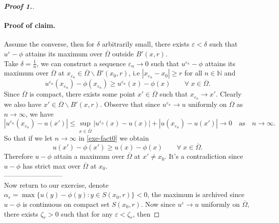 \documentclass[12pt, oneside]{amsart}  	%
\begin{document}
\begin{proof}[\textbf{Proof 1.}]
\paragraph{\textbf{Proof of claim.}} Assume the converse, then for $\delta$ arbitrarily small, there exists $\varepsilon<\delta$ such that $u^{\varepsilon} -\phi$ attains its maximum over $\overline{\Omega}$ outside $B'(x,r)$. \\
Take $\delta = \frac{1}{n}$, we can construct a sequence $\varepsilon_n \longrightarrow 0$ such that $u^{\varepsilon_n} - \phi$ attains its maximum over $\overline{\Omega}$ at $x_{\varepsilon_n} \in \overline{\Omega}\backslash B'(x_0,r)$, i.e $|x_{\varepsilon_n} - x_0| \geq r$ for all $n\in \mathbb{N}$ and
\begin{equation}\label{exe-fact0}
u^{\varepsilon_n}\left(x_{\varepsilon_n}\right) - \phi\left(x_{\varepsilon_n}\right) \geq  u^{\varepsilon_n}\left(x\right) - \phi\left(x\right) \qquad\forall\; x\in \overline{\Omega}.
\end{equation}
Since $\overline{\Omega}$ is compact, there exists some point $x'\in \overline{\Omega}$ such that $x_{\varepsilon_n} \longrightarrow x'$. Clearly we also have $x'\in \overline{\Omega}\backslash B'(x,r)$. Observe that since $u^{\varepsilon_n}\longrightarrow u$ uniformly on $\overline{\Omega}$ as $n\longrightarrow\infty$, we have
\begin{equation*}
\left|u^{\varepsilon_n}\left(x_{\varepsilon_n}\right) - u(x') \right|\leq \sup_{x\in \overline{\Omega}} \left|u^{\varepsilon_n}(x) - u(x)\right| + \left|u\left(x_{\varepsilon_n}\right) - u(x')\right| \longrightarrow 0\quad\text{as}\quad n\longrightarrow\infty.
\end{equation*}
So that if we let $n\longrightarrow\infty$ in \eqref{exe-fact0} we obtain
\begin{equation*}
u(x') - \phi(x')  \geq u(x) - \phi(x) \qquad\forall\;x\in \overline{\Omega}.
\end{equation*}
Therefore $u-\phi$ attain a maximum over $\overline{\Omega}$ at $x'\neq x_0$. It's a contradiction since $u-\phi$ has strict max over $\overline{\Omega}$ at $x_0$. \\
--------------------------\\
Now return to our exercise, denote $\alpha_r = \max  \{u(y) - \phi(y): y\in S(x_0,r)\} < 0$, the maximum is archived since $u-\phi$ is continuous on compact set $S(x_0,r)$. Now since $u^\varepsilon \longrightarrow u$ uniformly on $\overline{\Omega}$, there exists $\zeta_r>0$ such that for any $\varepsilon < \zeta_r$, then

\end{proof}
\end{document}
